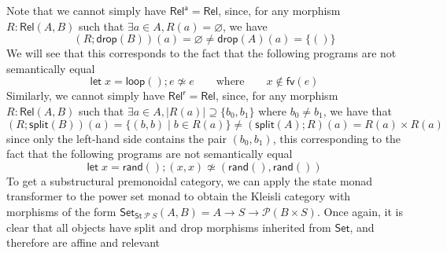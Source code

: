 \documentclass[acmsmall,screen,review]{acmart}
\newcommand{\mc}[1]{\ensuremath{\mathcal{#1}}}
\newcommand{\ms}[1]{\ensuremath{\mathsf{#1}}}
\begin{document}
Note that we cannot simply have \(\ms{Rel}^{\ms{a}} = \ms{Rel}\), since, for
any morphism \(R: \ms{Rel}(A, B)\) such that \(\exists a \in A, R(a) =
\varnothing\), we have
\begin{equation}
  (R;\ms{drop}(B))(a) = \varnothing \neq \ms{drop}(A)(a) = \{()\}
\end{equation}
We will see that this corresponds to the fact that the following programs are
not semantically equal
\begin{equation}
  \ms{let}\;x = \ms{loop}(); e \not\simeq e \qquad \text{where} \qquad x \notin \ms{fv}(e)
\end{equation}
Similarly, we cannot simply have \(\ms{Rel}^{\ms{r}} = \ms{Rel}\), since,
for any morphism \(R: \ms{Rel}(A, B)\) such that \(\exists a \in A, |R(a)|
\supseteq \{b_0, b_1\}\) where \(b_0 \neq b_1\), we have that
\begin{equation}
  (R;\ms{split}(B))(a) = \{(b, b) \mid b \in R(a)\} \neq (\ms{split}(A);R)(a) = R(a) \times R(a) 
\end{equation}
since only the left-hand side contains the pair \((b_0, b_1)\), this
corresponding to the fact that the following programs are not semantically equal
\begin{equation}
  \ms{let}\;x = \ms{rand}(); (x, x) \not\simeq (\ms{rand}(), \ms{rand}())
\end{equation}
To get a substructural premonoidal category, we can apply the state monad
transformer to the power set monad to obtain the Kleisli category with morphisms
of the form \(\ms{Set}_{\ms{St}\;\mc{P}\;S}(A, B) = A \to S \to \mc{P}(B \times
S)\). Once again, it is clear that all objects have split and drop morphisms
inherited from \(\ms{Set}\), and therefore are affine and relevant
\end{document}
